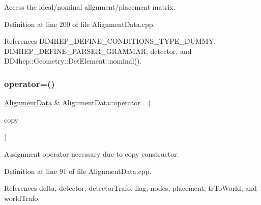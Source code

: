 Access the ideal/nominal alignment/placement matrix. 



Definition at line 200 of file Alignment\+Data.\+cpp.



References D\+D4\+H\+E\+P\+\_\+\+D\+E\+F\+I\+N\+E\+\_\+\+C\+O\+N\+D\+I\+T\+I\+O\+N\+S\+\_\+\+T\+Y\+P\+E\+\_\+\+D\+U\+M\+MY, D\+D4\+H\+E\+P\+\_\+\+D\+E\+F\+I\+N\+E\+\_\+\+P\+A\+R\+S\+E\+R\+\_\+\+G\+R\+A\+M\+M\+AR, detector, and D\+D4hep\+::\+Geometry\+::\+Det\+Element\+::nominal().

\hypertarget{class_d_d4hep_1_1_alignments_1_1_alignment_data_a52c323f2dd5393ea5d9e77f8df11c6d0}{}\label{class_d_d4hep_1_1_alignments_1_1_alignment_data_a52c323f2dd5393ea5d9e77f8df11c6d0} 
\subsubsection{\texorpdfstring{operator=()}{operator=()}}
{\footnotesize\ttfamily \hyperlink{class_d_d4hep_1_1_alignments_1_1_alignment_data}{Alignment\+Data} \& Alignment\+Data\+::operator= (\begin{DoxyParamCaption}\item[{const \hyperlink{class_d_d4hep_1_1_alignments_1_1_alignment_data}{Alignment\+Data} \&}]{copy }\end{DoxyParamCaption})}



Assignment operator necessary due to copy constructor. 



Definition at line 91 of file Alignment\+Data.\+cpp.



References delta, detector, detector\+Trafo, flag, nodes, placement, tr\+To\+World, and world\+Trafo.

\hypertarget{class_d_d4hep_1_1_alignments_1_1_alignment_data_aa9a06d09e56fd93a48cce689a654884e}{}\label{class_d_d4hep_1_1_alignments_1_1_alignment_data_aa9a06d09e56fd93a48cce689a654884e} 
